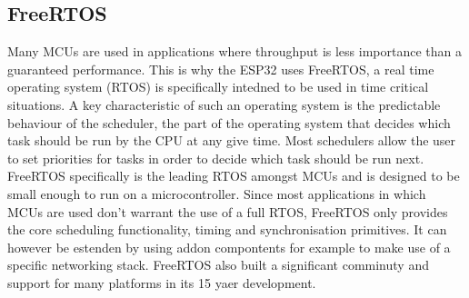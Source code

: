 \subsection{FreeRTOS}
Many MCUs are used in applications where throughput is less importance than a guaranteed performance. This is why the ESP32 uses FreeRTOS, a real time operating system (RTOS) is specifically intedned to be used in time critical situations. A key characteristic of such an operating system is the predictable behaviour of the scheduler, the part of the operating system that decides which task should be run by the CPU at any give time. Most schedulers allow the user to set priorities for tasks in order to decide which task should be run next.
FreeRTOS specifically is the leading RTOS amongst MCUs and is designed to be small enough to run on a microcontroller. Since most applications in which MCUs are used don't warrant the use of a full RTOS, FreeRTOS only provides the core scheduling functionality, timing and synchronisation primitives. It can however be estenden by using addon compontents for example to make use of a specific networking stack. FreeRTOS also built a significant comminuty and support for many platforms in its 15 yaer development.
